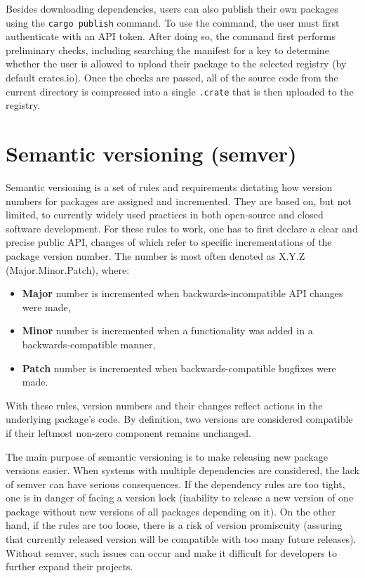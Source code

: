 \documentclass[licencjacka,en]{pracamgr}
\begin{document}
Besides downloading dependencies, users can also publish their own packages using
the \texttt{cargo publish} command. To use the command, the user must first authenticate with
an API token. After doing so, the command first performs preliminary checks, including searching
the manifest for a key to determine whether the user is allowed to upload their package
to the selected registry (by default crates.io). Once the checks are passed, all of the source code
from the current directory is compressed into a single \texttt{.crate} that is then uploaded
to the registry.

\section{Semantic versioning (semver)}\label{r:section_semver}

Semantic versioning is a set of rules and requirements dictating how version numbers for packages
are assigned and incremented. They are based on, but not limited, to currently widely used
practices in both open-source and closed software development. For these rules to work, one has to
first declare a clear and precise public API, changes of which refer to specific incrementations of
the package version number. The number is most often denoted as X.Y.Z (Major.Minor.Patch), where:
\begin{itemize}
	\item \textbf{Major} number is incremented when backwards-incompatible API changes were made,
	\item \textbf{Minor} number is incremented when a functionality was added in
		a backwards-compatible manner,
	\item \textbf{Patch} number is incremented when backwards-compatible bugfixes were made.
\end{itemize}
With these rules, version numbers and their changes reflect actions in the underlying
package's code. By definition, two versions are considered compatible if their leftmost non-zero
component remains unchanged.

The main purpose of semantic versioning is to make releasing new package versions easier.
When systems with multiple dependencies are considered, the lack of semver can have serious
consequences. If the dependency rules are too tight, one is in danger of facing a version lock
(inability to release a new version of one package without new versions of all packages depending
on it). On the other hand, if the rules are too loose, there is a risk of version promiscuity
(assuring that currently released version will be compatible with too many future releases).
Without semver, such issues can occur and make it difficult for developers to further expand
their projects.
\end{document}

